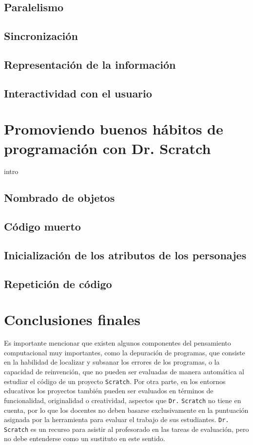 \documentclass[a4paper,10pt]{article}
\begin{document}
\subsection{Paralelismo}
\subsection{Sincronización}
\subsection{Representación de la información}
\subsection{Interactividad con el usuario}

\section{Promoviendo buenos hábitos de programación con Dr. Scratch}
intro
\subsection{Nombrado de objetos}
\subsection{Código muerto}
\subsection{Inicialización de los atributos de los personajes}
\subsection{Repetición de código}

\section{Conclusiones finales}
Es importante mencionar que existen algunos componentes del pensamiento computacional muy importantes, como la depuración de programas, que consiste en la habilidad de localizar y subsanar los errores de los programas, o la capacidad de reinvención, que no pueden ser evaluadas de manera automática al estudiar el código de un proyecto \texttt{Scratch}. Por otra parte, en los entornos educativos los proyectos también pueden ser evaluados en términos de funcionalidad, originalidad o creatividad, aspectos que \texttt{Dr.}{\tiny{ }}\texttt{Scratch} no tiene en cuenta, por lo que los docentes no deben basarse exclusivamente en la puntuación asignada por la herramienta para evaluar el trabajo de sus estudiantes. \texttt{Dr.}{\tiny{ }}\texttt{Scratch} es un recurso para asistir al profesorado en las tareas de evaluación, pero no debe entenderse como un sustituto en este sentido.
\end{document}
